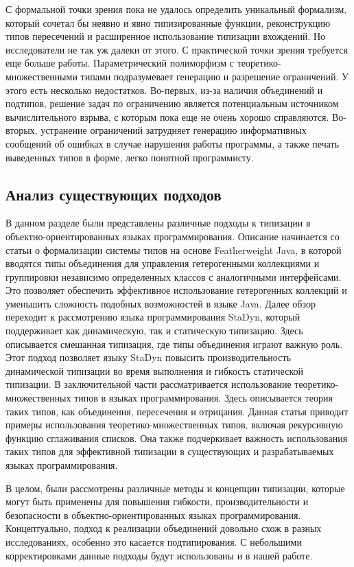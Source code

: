 С формальной точки зрения пока не удалось определить уникальный формализм, который сочетал бы неявно и явно
типизированные функции, реконструкцию типов пересечений и расширенное использование типизации вхождений.
Но исследователи не так уж далеки от этого.
С практической точки зрения требуется еще больше работы.
Параметрический полиморфизм с теоретико-множественными типами подразумевает генерацию и разрешение ограничений.
У этого есть несколько недостатков.
Во-первых, из-за наличия объединений и подтипов, решение задач по ограничению является потенциальным источником
вычислительного взрыва, с которым пока еще не очень хорошо справляются.
Во-вторых, устранение ограничений затрудняет генерацию информативных сообщений об ошибках в случае нарушения работы
программы, а также печать выведенных типов в форме, легко понятной программисту.

\subsection{Анализ существующих подходов}

В данном разделе были представлены различные подходы к типизации в объектно-ориентированных языках программирования.
Описание начинается со статьи о формализации системы типов на основе Featherweight Java, в которой вводятся типы
объединения для управления гетерогенными коллекциями и группировки независимо определенных классов с аналогичными
интерфейсами.
Это позволяет обеспечить эффективное использование гетерогенных коллекций и уменьшить сложность подобных возможностей
в языке Java.
Далее обзор переходит к рассмотрению языка программирования StaDyn, который поддерживает как динамическую, так и
статическую типизацию.
Здесь описывается смешанная типизация, где типы объединения играют важную роль.
Этот подход позволяет языку StaDyn повысить производительность динамической типизации во время выполнения и
гибкость статической типизации.
В заключительной части рассматривается использование теоретико-множественных типов в языках программирования.
Здесь описывается теория таких типов, как объединения, пересечения и отрицания.
Данная статья приводит примеры использования теоретико-множественных типов, включая рекурсивную функцию сглаживания
списков.
Она также подчеркивает важность использования таких типов для эффективной типизации в существующих и разрабатываемых
языках программирования.

В целом, были рассмотрены различные методы и концепции типизации, которые могут быть применены для повышения гибкости,
производительности и безопасности в объектно-ориентированных языках программирования.
Концептуально, подход к реализации объединений довольно схож в разных исследованиях, особенно это касается подтипирования.
С небольшими корректировками данные подходы будут использованы и в нашей работе.

\newpage
